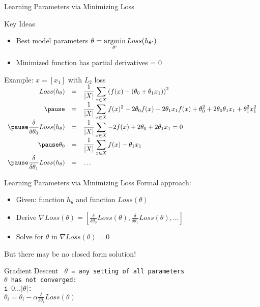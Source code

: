 \documentclass[14pt]{beamer}
\begin{document}
\begin{frame}[label=learning-via-loss]{Learning Parameters via Minimizing Loss}
\begin{block}{Key Ideas}
\begin{itemize}
\item Best model parameters $\theta = \displaystyle\operatorname*{\arg\!\min}_{\theta'} Loss(h_{\theta'})$
\item Minimized function has partial derivatives = 0
\end{itemize}
\end{block}
\pause
Example: $x = [x_1]$ with $L_2$ loss\\
\footnotesize\setlength{\arraycolsep}{0.25em}
$\begin{array}{ >{\displaystyle}r >{\displaystyle}c >{\displaystyle}l }
Loss(h_{\theta})
& = & \frac{1}{|X|}\sum_{x \in X} \left(f(x) - (\theta_0 + \theta_1 x_1)\right)^2\\
\pause
& = & \frac{1}{|X|}\sum_{x \in X} f(x)^2 - 2 \theta_0 f(x) - 2 \theta_1 x_1 f(x) + \theta_0^2 + 2 \theta_0 \theta_1 x_1 + \theta_1^2 x_1^2 \\
\pause
\displaystyle\frac{\delta}{\delta\theta_0} Loss(h_{\theta})
& = & \frac{1}{|X|}\sum_{x \in X} - 2 f(x) + 2 \theta_0 + 2 \theta_1 x_1 = 0\\
\pause
\theta_0
& = & \frac{1}{|X|}\sum_{x \in X} f(x) - \theta_1 x_1 \\
\pause
\displaystyle\frac{\delta}{\delta\theta_1} Loss(h_{\theta}) & = & \ldots \\
\end{array}$
\end{frame}

\begin{frame}[label=gradient-descent]{Learning Parameters via Minimizing Loss}
Formal approach:
\begin{itemize}
\item Given: function $h_{\theta}$ and function $Loss(\theta)$
\item Derive $\nabla Loss(\theta) = [\frac{\delta}{\delta\theta_0} Loss(\theta), \frac{\delta}{\delta\theta_1} Loss(\theta), \ldots]$
\item Solve for $\theta$ in $\nabla Loss(\theta) = 0$
\end{itemize}
\pause
But there may be no closed form solution!
\pause
\begin{block}{Gradient Descent}
\tt
$\theta$ = any setting of all parameters\\
 $\theta$ has not converged:\\
\tab {} i  $0 \ldots |\theta|$:\\
\tab \tab $\displaystyle \theta_i = \theta_i - \alpha \frac{\delta}{\delta\theta_i} Loss(\theta)$
\end{block}
\end{frame}
\end{document}
